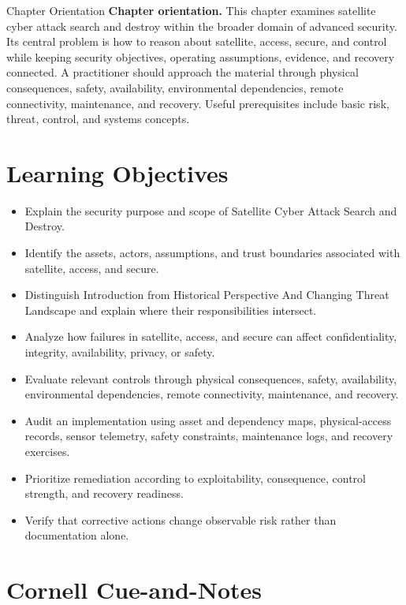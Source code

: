 \documentclass[11pt,letterpaper]{article}
\title{\CornellDocumentTitle}
\author{}
\date{}
\begin{document}
\maketitle
\begin{CornellOverviewBox}{Chapter Orientation}
\textbf{Chapter orientation.} This chapter examines satellite cyber attack search and destroy within the broader domain of advanced security. Its central problem is how to reason about satellite, access, secure, and control while keeping security objectives, operating assumptions, evidence, and recovery connected. A practitioner should approach the material through physical consequences, safety, availability, environmental dependencies, remote connectivity, maintenance, and recovery. Useful prerequisites include basic risk, threat, control, and systems concepts.
\end{CornellOverviewBox}
\section*{Learning Objectives}
\begin{itemize}
\item Explain the security purpose and scope of Satellite Cyber Attack Search and Destroy.
\item Identify the assets, actors, assumptions, and trust boundaries associated with satellite, access, and secure.
\item Distinguish Introduction from Historical Perspective And Changing Threat Landscape and explain where their responsibilities intersect.
\item Analyze how failures in satellite, access, and secure can affect confidentiality, integrity, availability, privacy, or safety.
\item Evaluate relevant controls through physical consequences, safety, availability, environmental dependencies, remote connectivity, maintenance, and recovery.
\item Audit an implementation using asset and dependency maps, physical-access records, sensor telemetry, safety constraints, maintenance logs, and recovery exercises.
\item Prioritize remediation according to exploitability, consequence, control strength, and recovery readiness.
\item Verify that corrective actions change observable risk rather than documentation alone.
\end{itemize}
\section*{Cornell Cue-and-Notes}
\end{document}
